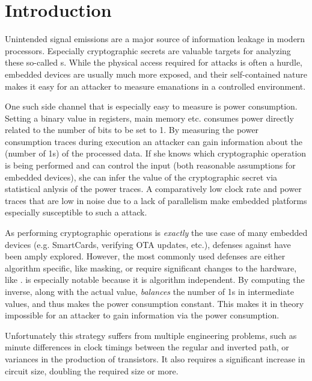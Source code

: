 \section{Introduction}
Unintended signal emissions are a major source of information leakage in modern processors.
Especially cryptographic secrets are valuable targets for analyzing these so-called \sidechannel{}s.
While the physical access required for \sidechannel{} attacks is often a hurdle, embedded devices are usually much more exposed, and their self-contained nature makes it easy for an attacker to measure \sidechannel{} emanations in a controlled environment.

One such side channel that is especially easy to measure is power consumption.
Setting a binary value in registers, main memory etc. consumes power directly related to the number of bits to be set to 1\cite{brier2004correlation}.
By measuring the power consumption traces during execution an attacker can gain information about the \hammingw{} (number of 1s) of the processed data.
If she knows which cryptographic operation is being performed and can control the input (both reasonable assumptions for embedded devices), she can infer the value of the cryptographic secret via statistical anlysis of the power traces.\cite{brier2004correlation}
A comparatively low clock rate and power traces that are low in noise due to a lack of parallelism make embedded platforms especially susceptible to such a \poweranalysis{} attack.

As performing cryptographic operations is \emph{exactly} the use case of many embedded devices (e.g. SmartCards, verifying OTA updates, etc.), defenses against \poweranalysis{} have been amply explored.
However, the most commonly used defenses are either algorithm specific, like masking, or require significant changes to the hardware, like \dual{}\cite{sokolov2005design}.
\dual{} is especially notable because it is algorithm independent.
By computing the inverse, along with the actual value, \dual{} \emph{balances} the number of 1s in intermediate values, and thus makes the power consumption constant.
This makes it in theory impossible for an attacker to gain information via the power consumption.

Unfortunately this strategy suffers from multiple engineering problems, such as minute differences in clock timings between the regular and inverted path\cite{baddam2008path}, or variances in the production of transistors\cite{razafindraibe2006formal}.
It also requires a significant increase in circuit size, doubling the required size or more\cite{baddam2008path}.

